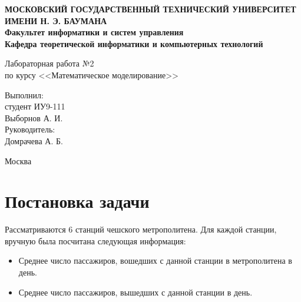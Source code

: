 \documentclass[12pt,a4paper,oneside]{extarticle}
\begin{document}
\pgfplotsset{compat=1.8}

\thispagestyle{empty}
\newpage
{
\centering


\textbf{
МОСКОВСКИЙ ГОСУДАРСТВЕННЫЙ ТЕХНИЧЕСКИЙ УНИВЕРСИТЕТ ИМЕНИ Н. Э. БАУМАНА \\
Факультет информатики и систем управления \\
Кафедра теоретической информатики и компьютерных технологий}
\bigskip
\bigskip
\bigskip
\bigskip
\bigskip
\bigskip
\bigskip

\vfill


Лабораторная работа №2 \\
по курсу <<Математическое моделирование>>

\bigskip

\bigskip

\vfill



\hfill\parbox{4cm} {
Выполнил:\\
студент ИУ9-111 \hfill \\
Выборнов А. И.\hfill \medskip\\
Руководитель:\\
Домрачева А. Б.\hfill
}


\vspace{\fill}

Москва \number\year
\clearpage
}



\clearpage


\section{Постановка задачи}
    Рассматриваются 6 станций чешского метрополитена. Для каждой станции, вручную была посчитана следующая информация:
    \begin{itemize}
        \item Среднее число пассажиров, вошедших с данной станции в метрополитена в день.
        \item Среднее число пассажиров, вышедших с данной станции в день.
    \end{itemize}


\end{document}
